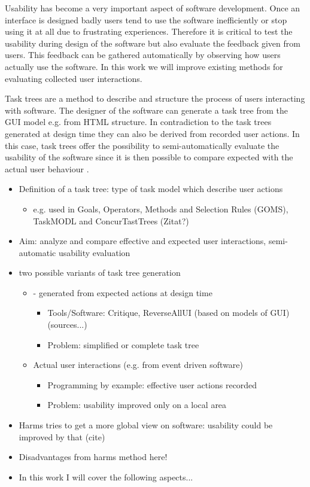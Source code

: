 Usability has become a very important aspect of software development. 
Once an interface is designed badly users tend to use the software inefficiently or stop using it at all due to frustrating experiences.
Therefore it is critical to test the usability during design of the software but also evaluate the feedback given from users. 
This feedback can be gathered automatically by observing how users actually use the software.
In this work we will improve existing methods for evaluating collected user interactions.

Task trees are a method to describe and structure the process of users interacting with software. 
The designer of the software can generate a task tree from the GUI model e.g. from HTML structure. 
In contradiction to the task trees generated at design time they can also be derived from recorded user actions. 
In this case, task trees offer the possibility to semi-automatically evaluate the usability of the software since it is then possible to compare expected with the actual user behaviour \citep{harms2013}.  

\begin{itemize}
	\item Definition of a task tree: type of task model which describe user actions
    	\begin{itemize}
		\item  e.g. used in Goals, Operators, Methods and Selection Rules (GOMS), TaskMODL and ConcurTastTrees (Zitat?)
	\end{itemize}
	\item Aim: analyze and compare effective and expected user interactions, semi-automatic usability evaluation
	\item two possible variants of task tree generation 
 	\begin{itemize}
		\item - generated from expected actions at design time
      		\begin{itemize}
			\item Tools/Software: Critique, ReverseAllUI (based on models of GUI) (sources...)
     			\item Problem: simplified or complete task tree
		\end{itemize}
		\item Actual user interactions (e.g. from event driven software)
     		\begin{itemize} 
			\item Programming by example: effective user actions recorded
			\item Problem: usability improved only on a local area
		\end{itemize}
	\end{itemize}
	\item Harms tries to get a more global view on software: usability could be improved by that (cite) 
	\item Disadvantages from harms method here!
	\item In this work I will cover the following aspects...
\end{itemize}


